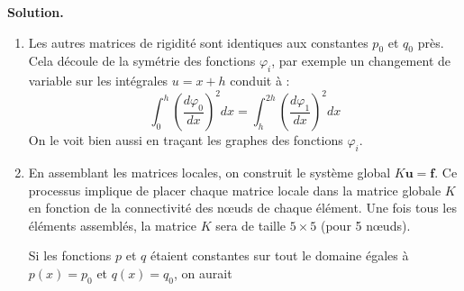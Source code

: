 \documentclass[11pt,a4paper]{report}
\newenvironment{solution}
{
    \vspace{0.5em}
    \begin{mdframed}[backgroundcolor=ThemeLight,leftmargin=0,rightmargin=0,skipabove=0.2em,skipbelow=0.2em]
    \textbf{Solution.}\\[0.5em]
}
{
    \end{mdframed}
    \vspace{0.5em}
}
\begin{document}
\begin{enumerate}[itemsep=0.5em]
{\begin{solution}
\begin{enumerate}
            Finalement :
            \[
            K_{12} = K_{21} = -\frac{p_0}{h} + q_0 \frac{h}{6}
            \]
            
            Pour le dernier coefficient de la matrice, on a :
            \[
            K_{22} = \int_{0}^{h} p_0 \left( \frac{1}{h} \right)^2 dx  + q_0 \int_{0}^{h} \Big(\frac{x}{h}\Big)^2 dx = \frac{p_0}{h} + q_0 \frac{h}{3}.
            \]
            
            En rassemblant les résultats, la matrice de rigidité sur le premier élément est:
            \[
            K = \frac{p_0}{h}
            \begin{pmatrix}
                1 & -1 \\
                -1 & 1
            \end{pmatrix}
            + q_0 \frac{h}{3}
            \begin{pmatrix}
                1 & 1/2 \\
                1/2 & 1
            \end{pmatrix}
            \]

            \item Les autres matrices de rigidité sont identiques aux constantes $p_0$ et $q_0$ près. Cela découle de la symétrie des fonctions $\varphi_i$, par exemple un changement de variable sur les intégrales $u=x+h$ conduit à :
            \[
            \int_0^h \left( \frac{d\varphi_0}{dx} \right)^2 dx = \int_h^{2h} \left( \frac{d\varphi_1}{dx} \right)^2 dx 
            \]
            On le voit bien aussi en traçant les graphes des fonctions $\varphi_i$.
            \item En assemblant les matrices locales, on construit le système global $K \mathbf{u} = \mathbf{f}$. Ce processus implique de placer chaque matrice locale dans la matrice globale $K$ en fonction de la connectivité des nœuds de chaque élément. 
            Une fois tous les éléments assemblés, la matrice $K$ sera de taille $5 \times 5$ (pour 5 nœuds).

            Si les fonctions $p$ et $q$ étaient constantes sur tout le domaine égales à $p(x)=p_0$ et $q(x)=q_0$, on aurait


\end{enumerate}
\end{solution}}
\end{enumerate}
\end{document}
